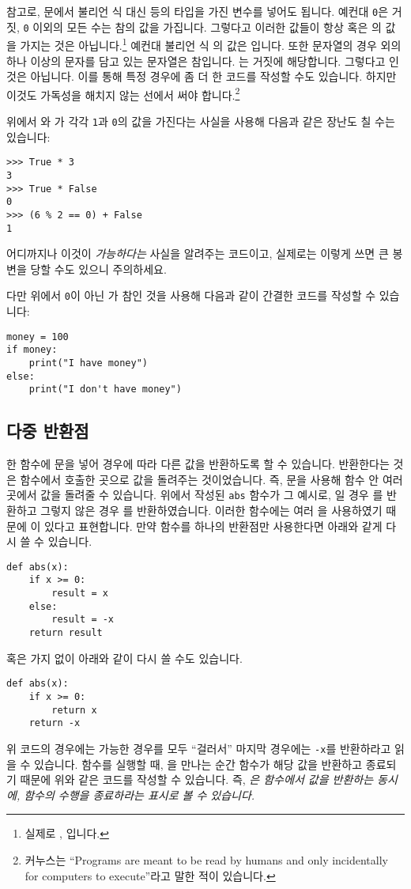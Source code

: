 \documentclass[../main.tex]{subfiles}
\begin{document}
참고로, 문에서 불리언 식 대신  등의 타입을 가진
변수를 넣어도 됩니다. 예컨대
\texttt{0}은 거짓, \texttt{0} 이외의 모든 수는 참의 값을 가집니다.
그렇다고 이러한 값들이 항상
 혹은 의 값을 가지는 것은 아닙니다.\footnote{실제로
, 입니다.}
예컨대 불리언 식 의 값은 입니다.
또한 문자열의 경우  외의 하나 이상의 문자를 담고 있는 문자열은 참입니다.
는 거짓에 해당합니다.
그렇다고 인 것은 아닙니다.
이를 통해 특정 경우에 좀 더 한 코드를 작성할 수도 있습니다.
하지만 이것도 가독성을 해치지 않는 선에서 써야 합니다.\footnote{커누스는 ``Programs are meant to be read by humans and only incidentally for computers to execute''라고 말한 적이 있습니다.}

위에서 와 가 각각 \verb/1/과 \verb/0/의 값을 가진다는 사실을 사용해 다음과 같은 장난도 칠 수는 있습니다:
\begin{verbatim}
>>> True * 3
3
>>> True * False
0
>>> (6 % 2 == 0) + False
1
\end{verbatim}
어디까지나 이것이 \emph{가능하다는} 사실을 알려주는 코드이고, 실제로는 이렇게 쓰면 큰 봉변을 당할 수도 있으니 주의하세요.

다만 위에서 \verb/0/이 아닌 가 참인 것을 사용해 다음과 같이 간결한 코드를 작성할 수 있습니다:
\begin{verbatim}
money = 100
if money:
    print("I have money")
else:
    print("I don't have money")
\end{verbatim}

\subsection{다중 반환점}
한 함수에 문을 넣어 경우에 따라 다른 값을 반환하도록 할 수 있습니다.
반환한다는 것은 함수에서 호출한 곳으로 값을 돌려주는 것이었습니다.
즉, 문을 사용해 함수 안 여러 곳에서 값을 돌려줄 수 있습니다.
위에서 작성된 \verb/abs/ 함수가 그 예시로, 일 경우 를 반환하고 그렇지 않은 경우
를 반환하였습니다.  이러한 함수에는 여러 을
사용하였기 때문에 이 있다고 표현합니다.
만약  함수를 하나의 반환점만 사용한다면 아래와 같게 다시 쓸 수 있습니다.
\begin{verbatim}
def abs(x):
    if x >= 0:
        result = x
    else:
        result = -x
    return result
\end{verbatim}
혹은  가지 없이
아래와 같이 다시 쓸 수도 있습니다.
\begin{verbatim}
def abs(x):
    if x >= 0:
        return x
    return -x
\end{verbatim}
위 코드의 경우에는 가능한 경우를 모두 ``걸러서'' 마지막 경우에는 \texttt{-x}를
반환하라고 읽을 수 있습니다.
함수를 실행할 때, 을 만나는 순간 함수가 해당 값을 반환하고 종료되기 때문에 위와 같은 코드를 작성할 수 있습니다.
즉, \emph{은 함수에서 값을 반환하는 동시에, 함수의 수행을
종료하라는 표시로 볼 수 있습니다.}
\end{document}
